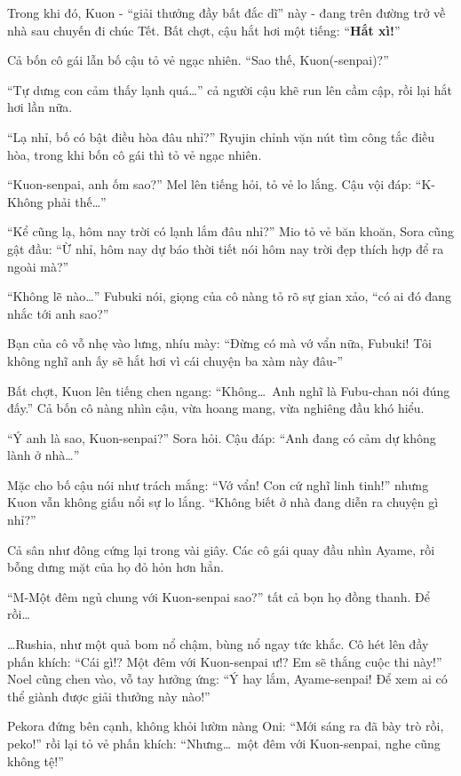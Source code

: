\documentclass[../main.tex]{subfiles}
\begin{document}
\il

Trong khi đó, Kuon - ``giải thưởng đầy bất đắc dĩ'' này - đang trên đường trở về nhà sau chuyến đi chúc Tết. Bất chợt, cậu hắt hơi một tiếng: ``\textbf{Hắt xì!}''

Cả bốn cô gái lẫn bố cậu tỏ vẻ ngạc nhiên. ``Sao thế, Kuon(-senpai)?''

``Tự dưng con cảm thấy lạnh quá\dots'' cả người cậu khẽ run lên cầm cập, rồi lại hắt hơi lần nữa.

``Lạ nhỉ, bố có bật điều hòa đâu nhỉ?'' Ryujin chỉnh vặn nút tìm công tắc điều hòa, trong khi bốn cô gái thì tỏ vẻ ngạc nhiên.

``Kuon-senpai, anh ốm sao?'' Mel lên tiếng hỏi, tỏ vẻ lo lắng. Cậu vội đáp: ``K-Không phải thế\dots''

``Kể cũng lạ, hôm nay trời có lạnh lắm đâu nhỉ?'' Mio tỏ vẻ băn khoăn, Sora cũng gật đầu: ``Ừ nhỉ, hôm nay dự báo thời tiết nói hôm nay trời đẹp thích hợp để ra ngoài mà?''

``Không lẽ nào\dots'' Fubuki nói, giọng của cô nàng tỏ rõ sự gian xảo, ``có ai đó đang nhắc tới anh sao?''

Bạn của cô vỗ nhẹ vào lưng, nhíu mày: ``Đừng có mà vớ vẩn nữa, Fubuki! Tôi không nghĩ anh ấy sẽ hắt hơi vì cái chuyện ba xàm này đâu-''

Bất chợt, Kuon lên tiếng chen ngang: ``Không\dots\ Anh nghĩ là Fubu-chan nói đúng đấy.'' Cả bốn cô nàng nhìn cậu, vừa hoang mang, vừa nghiêng đầu khó hiểu.

``Ý anh là sao, Kuon-senpai?'' Sora hỏi. Cậu đáp: ``Anh đang có cảm dự không lành ở nhà\dots''

Mặc cho bố cậu nói như trách mắng: ``Vớ vẩn! Con cứ nghĩ linh tinh!'' nhưng Kuon vẫn không giấu nổi sự lo lắng. ``Không biết ở nhà đang diễn ra chuyện gì nhỉ?''

\il

Cả sân như đông cứng lại trong vài giây. Các cô gái quay đầu nhìn Ayame, rồi bỗng dưng mặt của họ đỏ hỏn hơn hẳn.

``M-Một đêm ngủ chung với Kuon-senpai sao?'' tất cả bọn họ đồng thanh. Để rồi\dots

\dots Rushia, như một quả bom nổ chậm, bùng nổ ngay tức khắc. Cô hét lên đầy phấn khích: ``Cái gì!? Một đêm với Kuon-senpai ư!? Em sẽ thắng cuộc thi này!'' Noel cũng chen vào, vỗ tay hưởng ứng: ``Ý hay lắm, Ayame-senpai! Để xem ai có thể giành được giải thưởng này nào!''

Pekora đứng bên cạnh, không khỏi lườm nàng Oni: ``Mới sáng ra đã bày trò rồi, peko!'' rồi lại tỏ vẻ phấn khích: ``Nhưng\dots\ một đêm với Kuon-senpai, nghe cũng không tệ!''
\end{document}
